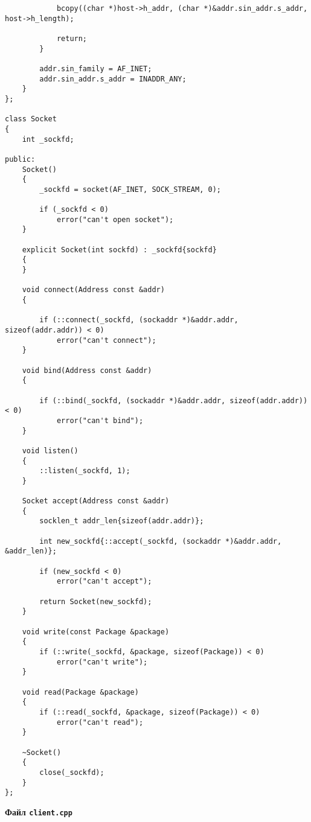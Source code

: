 \documentclass[a4paper,12pt]{extarticle}
\begin{document}
\begin{verbatim}
            bcopy((char *)host->h_addr, (char *)&addr.sin_addr.s_addr, host->h_length);

            return;
        }

        addr.sin_family = AF_INET;
        addr.sin_addr.s_addr = INADDR_ANY;
    }
};

class Socket
{
    int _sockfd;

public:
    Socket()
    {
        _sockfd = socket(AF_INET, SOCK_STREAM, 0);

        if (_sockfd < 0)
            error("can't open socket");
    }

    explicit Socket(int sockfd) : _sockfd{sockfd}
    {
    }

    void connect(Address const &addr)
    {

        if (::connect(_sockfd, (sockaddr *)&addr.addr, sizeof(addr.addr)) < 0)
            error("can't connect");
    }

    void bind(Address const &addr)
    {

        if (::bind(_sockfd, (sockaddr *)&addr.addr, sizeof(addr.addr)) < 0)
            error("can't bind");
    }

    void listen()
    {
        ::listen(_sockfd, 1);
    }

    Socket accept(Address const &addr)
    {
        socklen_t addr_len{sizeof(addr.addr)};

        int new_sockfd{::accept(_sockfd, (sockaddr *)&addr.addr, &addr_len)};

        if (new_sockfd < 0)
            error("can't accept");

        return Socket(new_sockfd);
    }

    void write(const Package &package)
    {
        if (::write(_sockfd, &package, sizeof(Package)) < 0)
            error("can't write");
    }

    void read(Package &package)
    {
        if (::read(_sockfd, &package, sizeof(Package)) < 0)
            error("can't read");
    }

    ~Socket()
    {
        close(_sockfd);
    }
};
\end{verbatim}
\centerline{\textbf{Файл \texttt{client.cpp}}}
\end{document}
